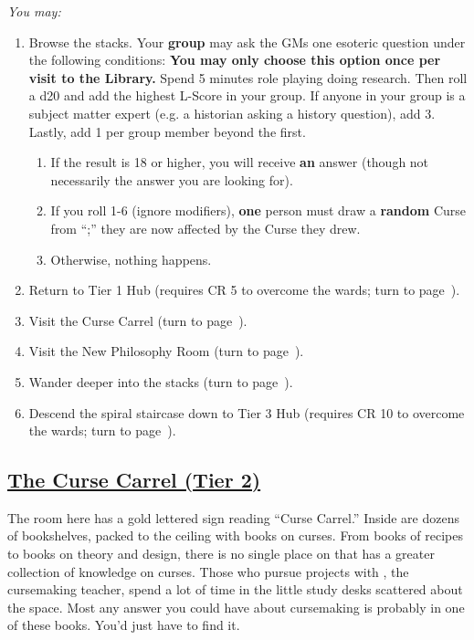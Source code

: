 \documentclass[sheet]{GL2020}
\begin{document}
\begingroup
\itshape
You may:
\begin{enumerate}[A]
  \item Browse the stacks. Your \textbf{group} may ask the GMs one esoteric question under the following conditions: \textbf{You may only choose this option once per visit to the Library.} Spend 5 minutes role playing doing research. Then roll a d20 and add the highest L-Score in your group. If anyone in your group is a subject matter expert (e.g. a historian asking a history question), add 3. Lastly, add 1 per group member beyond the first.
	\begin{enumerate}
		\item If the result is 18 or higher, you will receive \textbf{an} answer (though not necessarily the answer you are looking for). 
		\item If you roll 1-6 (ignore modifiers), \textbf{one} person must draw a \textbf{random} Curse from ``\sCursedCodicesEnvelope{};'' they are now affected by the Curse they drew. 
		\item Otherwise, nothing happens.
	\end{enumerate}
	\item Return to Tier 1 Hub (requires CR 5 to overcome the wards; turn to page~\pageref{TierOneHub}).
	\item Visit the Curse Carrel (turn to page~\pageref{CurseCarrel}).
	\item Visit the New Philosophy Room (turn to page~\pageref{NewPhilosophy}).
	\item Wander deeper into the stacks (turn to page~\pageref{DeepStacks}).
	\item Descend the spiral staircase down to Tier 3 Hub (requires CR 10 to overcome the wards; turn to page~\pageref{TierThreeHub}).
\end{enumerate}
\endgroup

\clearpage


\begin{center}\section*{\underline{The Curse Carrel (Tier 2)}}\end{center}
\label{CurseCarrel}

The room here has a gold lettered sign reading ``Curse Carrel.'' Inside are dozens of bookshelves, packed to the ceiling with books on curses. From books of recipes to books on theory and design, there is no single place on \pEarth{} that has a greater collection of knowledge on curses. Those who pursue projects with \cPrince{\Heir} \cPrince{}, the cursemaking teacher, spend a lot of time in the little study desks scattered about the space. Most any answer you could have about cursemaking is probably in one of these books. You’d just have to find it. 
\end{document}

